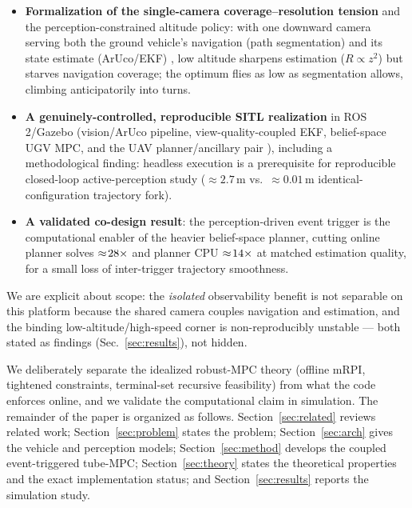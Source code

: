 \documentclass[letterpaper, 10 pt, conference]{ieeeconf}  %
\newcommand{\RESforkGUI}{2.7}\newcommand{\RESforkHL}{0.01}
\begin{document}
\begin{itemize}
\item \textbf{Formalization of the single-camera coverage--resolution tension} and the
perception-constrained altitude policy: with one downward camera serving both the ground
vehicle's navigation (path segmentation) and its state estimate (ArUco/EKF)
\cite{platt2010belief,vandenberg2012motion}, low altitude sharpens estimation ($R\propto z^2$)
but starves navigation coverage; the optimum flies as low as segmentation allows, climbing
anticipatorily into turns.

\item \textbf{A genuinely-controlled, reproducible SITL realization} in ROS\,2/Gazebo
(vision/ArUco pipeline, view-quality-coupled EKF, belief-space UGV MPC, and the UAV
planner/ancillary pair \cite{mayne2005robust,eqtami2010event}), including a methodological
finding: headless execution is a prerequisite for reproducible closed-loop active-perception
study ($\approx\!\RESforkGUI$\,m vs.\ $\approx\!\RESforkHL$\,m identical-configuration
trajectory fork).

\item \textbf{A validated co-design result}: the perception-driven event trigger is the
computational enabler of the heavier belief-space planner, cutting online planner solves
$\approx\!28\times$ and planner CPU $\approx\!14\times$ at matched estimation
quality, for a small loss of inter-trigger trajectory smoothness.
\end{itemize}
We are explicit about scope: the \emph{isolated} observability benefit is not separable on this
platform because the shared camera couples navigation and estimation, and the binding
low-altitude/high-speed corner is non-reproducibly unstable --- both stated as findings
(Sec.~\ref{sec:results}), not hidden.

We deliberately separate the idealized robust-MPC theory (offline mRPI, tightened
constraints, terminal-set recursive feasibility) from what the code enforces
online, and we validate the computational claim in simulation. The remainder of
the paper is organized as follows. Section~\ref{sec:related} reviews related
work; Section~\ref{sec:problem} states the problem; Section~\ref{sec:arch} gives
the vehicle and perception models; Section~\ref{sec:method} develops the coupled
event-triggered tube-MPC; Section~\ref{sec:theory} states the theoretical
properties and the exact implementation status; and Section~\ref{sec:results}
reports the simulation study.
\end{document}
